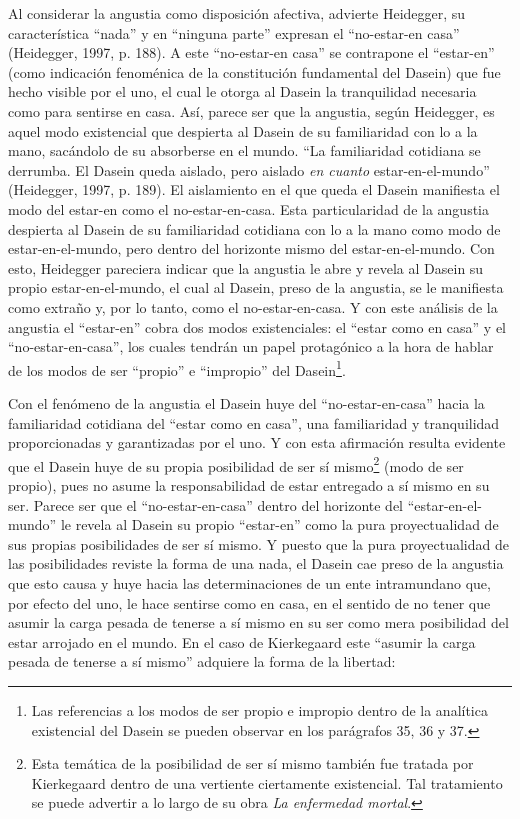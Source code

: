 \documentclass[]{article}
\begin{document}
Al considerar la angustia como disposición afectiva, advierte Heidegger, su característica ``nada'' y en ``ninguna parte'' expresan el ``no-estar-en casa'' (Heidegger, 1997, p. 188). A este ``no-estar-en casa'' se contrapone el ``estar-en'' (como indicación fenoménica de la constitución fundamental del Dasein) que fue hecho visible por el uno, el cual le otorga al Dasein la tranquilidad necesaria como para sentirse en casa. Así, parece ser que la angustia, según Heidegger, es aquel modo existencial que despierta al Dasein de su familiaridad con lo a la mano, sacándolo de su absorberse en el mundo. ``La familiaridad cotidiana se derrumba. El Dasein queda aislado, pero aislado \emph{en cuanto} estar-en-el-mundo'' (Heidegger, 1997, p. 189). El aislamiento en el que queda el Dasein manifiesta el modo del estar-en como el no-estar-en-casa. Esta particularidad de la angustia despierta al Dasein de su familiaridad cotidiana con lo a la mano como modo de estar-en-el-mundo, pero dentro del horizonte mismo del estar-en-el-mundo. Con esto, Heidegger pareciera indicar que la angustia le abre y revela al Dasein su propio estar-en-el-mundo, el cual al Dasein, preso de la angustia, se le manifiesta como extraño y, por lo tanto, como el no-estar-en-casa. Y con este análisis de la angustia el ``estar-en'' cobra dos modos existenciales: el ``estar como en casa'' y el ``no-estar-en-casa'', los cuales tendrán un papel protagónico a la hora de hablar de los modos de ser ``propio'' e ``impropio'' del Dasein\footnote{Las referencias a los modos de ser propio e impropio dentro de la analítica existencial del Dasein se pueden observar en los parágrafos 35, 36 y 37.}.

Con el fenómeno de la angustia el Dasein huye del ``no-estar-en-casa'' hacia la familiaridad cotidiana del ``estar como en casa'', una familiaridad y tranquilidad proporcionadas y garantizadas por el uno. Y con esta afirmación resulta evidente que el Dasein huye de su propia posibilidad de ser sí mismo\footnote{Esta temática de la posibilidad de ser sí mismo también fue tratada por Kierkegaard dentro de una vertiente ciertamente existencial. Tal tratamiento se puede advertir a lo largo de su obra \emph{La enfermedad mortal}.} (modo de ser propio), pues no asume la responsabilidad de estar entregado a sí mismo en su ser. Parece ser que el ``no-estar-en-casa'' dentro del horizonte del ``estar-en-el-mundo'' le revela al Dasein su propio ``estar-en'' como la pura proyectualidad de sus propias posibilidades de ser sí mismo. Y puesto que la pura proyectualidad de las posibilidades reviste la forma de una nada, el Dasein cae preso de la angustia que esto causa y huye hacia las determinaciones de un ente intramundano que, por efecto del uno, le hace sentirse como en casa, en el sentido de no tener que asumir la carga pesada de tenerse a sí mismo en su ser como mera posibilidad del estar arrojado en el mundo. En el caso de Kierkegaard este ``asumir la carga pesada de tenerse a sí mismo'' adquiere la forma de la libertad:
\end{document}

